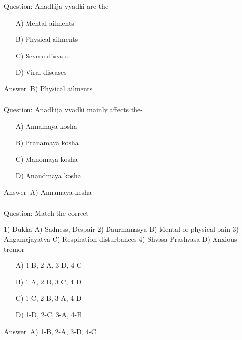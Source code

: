 \begin{frame}[fragile]\frametitle{}

Question: Anadhija vyadhi are the-

\begin{itemize}
\item[A)] Mental ailments
\item[B)] Physical ailments
\item[C)] Severe diseases
\item[D)] Viral diseases
\end{itemize}

Answer: B) Physical ailments
\end{frame}

\begin{frame}[fragile]\frametitle{}

Question: Anadhija vyadhi mainly affects the-

\begin{itemize}
\item[A)] Annamaya kosha
\item[B)] Pranamaya kosha
\item[C)] Manomaya kosha
\item[D)] Anandmaya kosha
\end{itemize}

Answer: A) Annamaya kosha
\end{frame}

\begin{frame}[fragile]\frametitle{}

Question: Match the correct-

1) Dukha                            A) Sadness, Despair
2) Daurmanasya                    B) Mental or physical pain
3) Angamejayatva                  C) Respiration disturbances
4) Shvasa Prashvasa              D) Anxious tremor

\begin{itemize}
\item[A)] 1-B, 2-A, 3-D, 4-C
\item[B)] 1-A, 2-B, 3-C, 4-D
\item[C)] 1-C, 2-B, 3-A, 4-D
\item[D)] 1-D, 2-C, 3-A, 4-B
\end{itemize}

Answer: A) 1-B, 2-A, 3-D, 4-C
\end{frame}

